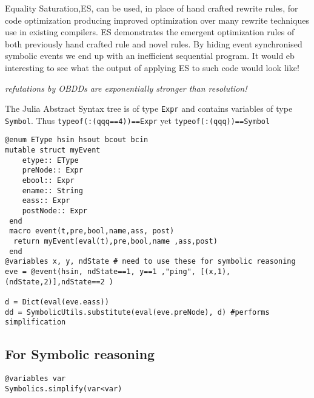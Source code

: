 Equality Saturation,ES,  can be used, in place of hand crafted rewrite rules, for code optimization producing improved optimization over many rewrite techniques use in existing compilers.  ES demonstrates the emergent optimization rules of both previously hand crafted rule and novel rules.
 By hiding event synchronised symbolic events  we end up with an inefficient sequential program. It would eb interesting to see what the output of applying  ES to such code would look like!

\emph{refutations by OBDDs are exponentially stronger than resolution!}



The Julia Abstract Syntax tree is of type \verb|Expr| and contains variables of type \verb|Symbol|.  Thus \verb|typeof(:(qqq==4))==Expr| yet \verb|typeof(:(qqq))==Symbol|

\begin{verbatim}
@enum EType hsin hsout bcout bcin
mutable struct myEvent
    etype:: EType
    preNode:: Expr
    ebool:: Expr
    ename:: String
    eass:: Expr
    postNode:: Expr
 end
 macro event(t,pre,bool,name,ass, post)
  return myEvent(eval(t),pre,bool,name ,ass,post)
 end
@variables x, y, ndState # need to use these for symbolic reasoning  
eve = @event(hsin, ndState==1, y==1 ,"ping", [(x,1),(ndState,2)],ndState==2 )

d = Dict(eval(eve.eass))
dd = SymbolicUtils.substitute(eval(eve.preNode), d) #performs simplification
\end{verbatim}

\subsection{For Symbolic reasoning}
\begin{verbatim}
@variables var
Symbolics.simplify(var<var)
\end{verbatim}



